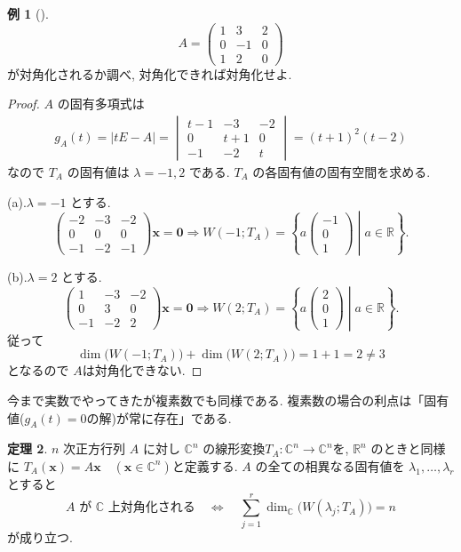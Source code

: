 \documentclass[dvipdfmx,a4paper,11pt]{article} %
\theoremstyle{definition}
\newtheorem{thm}{定理}[section]
\newtheorem{eg}[thm]{例}
\begin{document}
\begin{eg}
[{\cite[例題5.4.3]{M}}]
\[
A=
\begin{pmatrix}
1&3&2\\
0&-1&0\\
1&2&0
\end{pmatrix}
\]
が対角化されるか調べ, 対角化できれば対角化せよ.
\end{eg}

\begin{proof}


$A$ の固有多項式は
\[
\begin{aligned}
g_A(t)
=\lvert tE-A\rvert
=
\begin{vmatrix}
t-1&-3&-2\\
0&t+1&0\\
-1&-2&t
\end{vmatrix}
=(t+1)^2(t-2)
\end{aligned}
\]
なので $T_A$ の固有値は $\lambda=-1,2$ である. $T_A$ の各固有値の固有空間を求める.

(a).$\lambda=-1$ とする.
\[
\begin{pmatrix}
-2&-3&-2\\
0&0&0\\
-1&-2&-1
\end{pmatrix}
\bm{x}=\bm{0}
\Rightarrow
W(-1;T_A)
=
\left\{
a
\begin{pmatrix}
-1\\
0\\
1
\end{pmatrix}
\mathrel{}\middle|\mathrel{}
a\in\mathbb{R}
\right\}.
\]

(b).$\lambda=2$ とする.
\[
\begin{pmatrix}
1&-3&-2\\
0&3&0\\
-1&-2&2
\end{pmatrix}
\bm{x}=\bm{0}
\Rightarrow
W(2;T_A)
=
\left\{
a
\begin{pmatrix}
2\\
0\\
1
\end{pmatrix}
\mathrel{}\middle|\mathrel{}
a\in\mathbb{R}
\right\}.
\]
従って
\[
\dim\bigl(W(-1;T_A)\bigr)+\dim\bigl(W(2;T_A)\bigr)
=1+1=2\neq3
\]
となるので
$A$は対角化できない.
\end{proof}

今まで実数でやってきたが複素数でも同様である. 
複素数の場合の利点は「固有値($g_A(t)=0$の解)が常に存在」である. 
\begin{thm}
$n$ 次正方行列 $A$ に対し $\mathbb{C}^n$ の線形変換\(T_A\colon\mathbb{C}^n\longrightarrow\mathbb{C}^n\)を, $\mathbb{R}^n$ のときと同様に
\(T_A(\bm{x})=A\bm{x}\quad(\bm{x}\in\mathbb{C}^n)\)と定義する. $A$ の全ての相異なる固有値を $\lambda_1,\ldots,\lambda_r$ とすると
\[
A\text{ が }\mathbb{C}\text{ 上対角化される}
\quad\Longleftrightarrow\quad
\sum_{j=1}^r\dim_{\mathbb{C}}\bigl(W(\lambda_j;T_A)\bigr)=n
\]
が成り立つ.
\end{thm}
\end{document}
